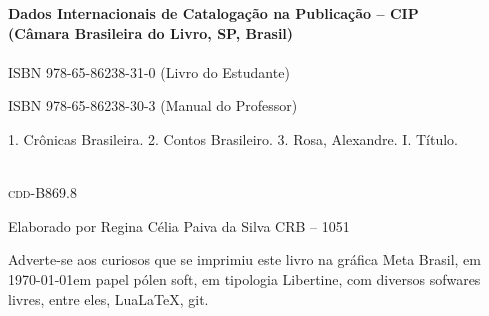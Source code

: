 \pagebreak

\ifodd\thepage\blankpage\fi

\parindent=0pt
\footnotesize\thispagestyle{empty}

\noindent\textbf{Dados Internacionais de Catalogação na Publicação -- CIP}\\
\noindent\textbf{(Câmara Brasileira do Livro, SP, Brasil)}\\

\dotfill\\

\hspace{20pt}ISBN 978-65-86238-31-0 (Livro do Estudante)

\hspace{20pt}ISBN 978-65-86238-30-3 (Manual do Professor)\\[6pt]

\hspace{20pt}\parbox{190pt}{1. Crônicas Brasileira. 2. Contos Brasileiro. 3. Rosa, Alexandre. I. Título.}\\[6pt]

\hspace{188pt}\textsc{cdd}-B869.8

\dotfill

\noindent{}Elaborado por Regina Célia Paiva da Silva CRB -- 1051\\
\mbox{}\vfill


\begin{center}
		\begin{minipage}{.7\textwidth}\tiny\noindent{}
		\centering\small
		Adverte-se aos curiosos que se imprimiu este 
		livro na gráfica Meta Brasil, 
		em \today em papel pólen soft, em tipologia Libertine, 
		com diversos sofwares livres, 
		entre eles, Lua\LaTeX, git.\\ 
		\medskip\\\
		\end{minipage}
\end{center}